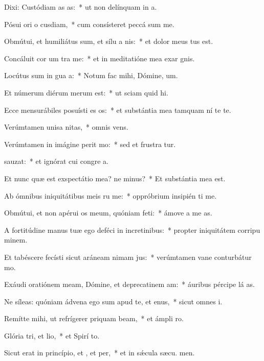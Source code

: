 \item Dixi: Custódiam as as:~* ut non delínquam in  a.
\item Pósui ori o cusdiam,~* cum consísteret peccá sum me.
\item Obmútui, et humiliátus sum, et sílu a nis:~* et dolor meus tus est.
\item Concáluit cor um tra me:~* et in meditatióne mea exar gnis.
\item Locútus sum in gua a:~* Notum fac mihi, Dómine,  um.
\item Et númerum diérum merum  est:~* ut sciam quid  hi.
\item Ecce mensurábiles posuísti es os:~* et substántia mea tamquam ní te te.
\item Verúmtamen unisa nitas,~* omnis  vens.
\item Verúmtamen in imágine perit mo:~* sed et frustra tur.
\item {}sauzat:~* et ignórat cui congre a.
\item Et nunc quæ est exspectátio mea? ne minus?~* Et substántia mea   est.
\item Ab ómnibus iniquitátibus meis ru me:~* oppróbrium insipién ti me.
\item Obmútui, et non apérui os meum, quóniam  feti:~* ámove a me  as.
\item A fortitúdine manus tuæ ego deféci in incretinibus:~* propter iniquitátem corripu minem.
\item Et tabéscere fecísti sicut aráneam nimam jus:~* verúmtamen vane conturbátur  mo.
\item Exáudi oratiónem meam, Dómine, et deprecatinem am:~* áuribus pércipe lá as.
\item Ne síleas: quóniam ádvena ego sum apud te, et enus,~* sicut omnes  i.
\item Remítte mihi, ut refrígerer priquam beam,~* et ámpli  ro.
\item Glória tri, et lio,~* et Spirí to.
\item Sicut erat in princípio, et , et per,~* et in sǽcula sæcu. men.

